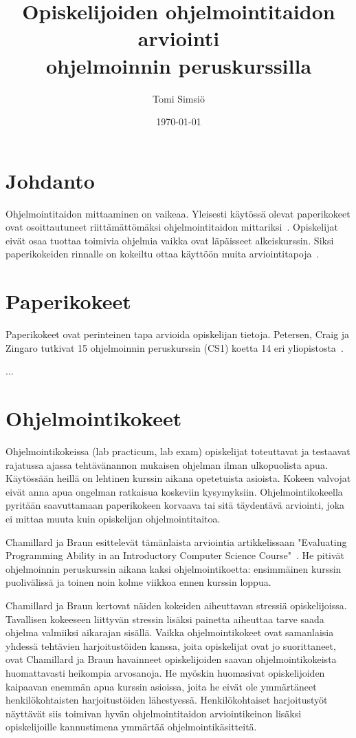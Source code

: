 \documentclass[finnish]{../tktltiki2}
\title{Opiskelijoiden ohjelmointitaidon arviointi \\ohjelmoinnin peruskurssilla}
\author{Tomi Simsiö}
\date{\today}
\theoremstyle{definition}
\theoremstyle{remark}
\begin{document}

\maketitle
\tableofcontents
\newpage



\section{Johdanto}
Ohjelmointitaidon mittaaminen on vaikeaa. Yleisesti käytössä olevat paperikokeet ovat osoittautuneet riittämättömäksi ohjelmointitaidon mittariksi~\cite{MAD01}. Opiskelijat eivät osaa tuottaa toimivia ohjelmia vaikka ovat läpäisseet alkeiskurssin. Siksi paperikokeiden rinnalle on kokeiltu ottaa käyttöön muita arviointitapoja~\cite{CJ01, CG02, WM03}.

\section{Paperikokeet}
Paperikokeet ovat perinteinen tapa arvioida opiskelijan tietoja. Petersen, Craig ja Zingaro tutkivat 15 ohjelmoinnin peruskurssin (CS1) koetta 14 eri yliopistosta~\cite{PCZ11}.

...

\section{Ohjelmointikokeet}
Ohjelmointikokeissa (lab practicum, lab exam) opiskelijat toteuttavat ja testaavat rajatussa ajassa tehtävänannon mukaisen ohjelman ilman ulkopuolista apua. Käytössään heillä on lehtinen kurssin aikana opetetuista asioista. Kokeen valvojat eivät anna apua ongelman ratkaisua koskeviin kysymyksiin. Ohjelmointikokeella pyritään saavuttamaan paperikokeen korvaava tai sitä täydentävä arviointi, joka ei mittaa muuta kuin opiskelijan ohjelmointitaitoa.

Chamillard ja Braun esittelevät tämänlaista arviointia artikkelissaan "Evaluating Programming Ability in an Introductory Computer Science Course"~\cite{CB00}. He pitivät ohjelmoinnin peruskurssin aikana kaksi ohjelmointikoetta: ensimmäinen kurssin puolivälissä ja toinen noin kolme viikkoa ennen kurssin loppua.

Chamillard ja Braun kertovat näiden kokeiden aiheuttavan stressiä opiskelijoissa. Tavallisen kokeeseen liittyvän stressin lisäksi painetta aiheuttaa tarve saada ohjelma valmiiksi aikarajan sisällä. Vaikka ohjelmointikokeet ovat samanlaisia yhdessä tehtävien harjoitustöiden kanssa, joita opiskelijat ovat jo suorittaneet, ovat Chamillard ja Braun havainneet opiskelijoiden saavan ohjelmointikokeista huomattavasti heikompia arvosanoja. He myöskin huomasivat opiskelijoiden kaipaavan enemmän apua kurssin asioissa, joita he eivät ole ymmärtäneet henkilökohtaisten harjoitustöiden lähestyessä. Henkilökohtaiset harjoitustyöt näyttävät siis toimivan hyvän ohjelmointitaidon arviointikeinon lisäksi opiskelijoille kannustimena ymmärtää ohjelmointikäsitteitä.
\end{document}
